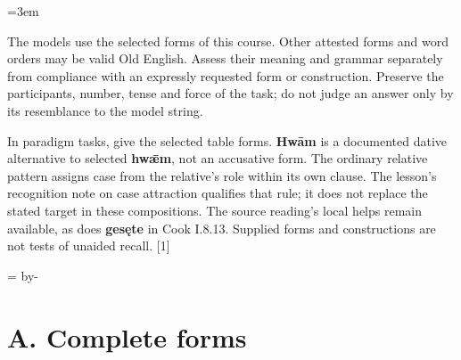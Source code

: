 \BookRecto
\begingroup
\renewcommand{\runningtitle}{Unit 8. Answer key}
\emergencystretch=3em
\newcommand{\itempara}[2]{\par\addvspace{3pt}\noindent\hangindent=1.8em\hangafter=1\makebox[1.8em][l]{#1.}#2\par}
\newcommand{\reserve}[1]{\par\penalty-100\begingroup\dimen0=\pagegoal\advance\dimen0 by-\pagetotal\ifdim\dimen0<#1\newpage\fi\endgroup}

\raggedright
{}

The models use the selected forms of this course. Other attested forms and word orders may be valid Old English. Assess their meaning and grammar separately from compliance with an expressly requested form or construction. Preserve the participants, number, tense and force of the task; do not judge an answer only by its resemblance to the model string.

In paradigm tasks, give the selected table forms. \textbf{Hwām} is a documented dative alternative to selected \textbf{hwǣm}, not an accusative form. The ordinary relative pattern assigns case from the relative's role within its own clause. The lesson's recognition note on case attraction qualifies that rule; it does not replace the stated target in these compositions. The source reading's local helps remain available, as does \textbf{gesęte} in Cook I.8.13. Supplied forms and constructions are not tests of unaided recall. [1]

\reserve{7\baselineskip}
\section*{A. Complete forms}

